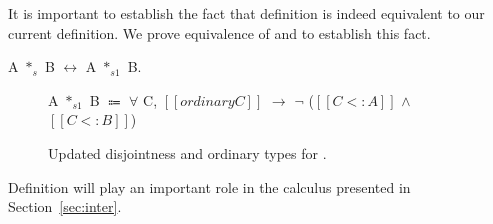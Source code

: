 It is important to establish the fact that definition
 is indeed equivalent to our current
definition. We prove equivalence of  and
 to establish this fact.

\begin{lemma}
A $*_{s}$ B $\longleftrightarrow$ A $*_{s1}$ B.
\end{lemma}

\begin{figure}
    \centering
  \medskip
  \begin{definition}
    \centering
    A $*_{s1}$ B $\Coloneqq$ $\forall$ C, $[[ordinary C]]$ $\rightarrow$ $\neg$ ($[[C <: A]]$ $\wedge$ $[[C <: B]]$)
    \label{def:union:disj1}
  \end{definition}
  \caption{Updated disjointness and ordinary types for \cal.
     }
  \label{fig:union:ord}
\end{figure}

Definition  will play an important role in the
calculus presented in Section~\ref{sec:inter}.
